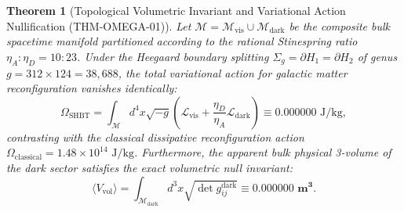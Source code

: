 \documentclass[11pt,onecolumn]{article}
\newtheorem{theorem}{Theorem}
\begin{document}
\begin{theorem}[Topological Volumetric Invariant and Variational Action Nullification (THM-OMEGA-01)]
\label{thm:omega_volumetric_invariant}
Let $\mathcal{M} = \mathcal{M}_{\text{vis}} \cup \mathcal{M}_{\text{dark}}$ be the composite bulk spacetime manifold partitioned according to the rational Stinespring ratio $\eta_A : \eta_D = 10 : 23$. Under the Heegaard boundary splitting $\Sigma_g = \partial H_1 = \partial H_2$ of genus $g = 312 \times 124 = 38{,}688$, the total variational action for galactic matter reconfiguration vanishes identically:
\begin{equation}
\Omega_{\text{SHBT}} = \int_{\mathcal{M}} d^4x \sqrt{-g} \left( \mathcal{L}_{\text{vis}} + \frac{\eta_D}{\eta_A}\mathcal{L}_{\text{dark}} \right) \equiv 0.000000\text{ J/kg},
\label{eq:omega_variational_action}
\end{equation}
contrasting with the classical dissipative reconfiguration action $\Omega_{\text{classical}} = 1.48 \times 10^{14}\text{ J/kg}$. Furthermore, the apparent bulk physical 3-volume of the dark sector satisfies the exact volumetric null invariant:
\begin{equation}
\langle V_{\text{vol}} \rangle = \int_{\mathcal{M}_{\text{dark}}} d^3x \sqrt{\det g_{ij}^{\text{dark}}} \equiv \mathbf{0.000000\text{ m}^3}.
\label{eq:dark_volumetric_zero}
\end{equation}
\end{theorem}
\end{document}
